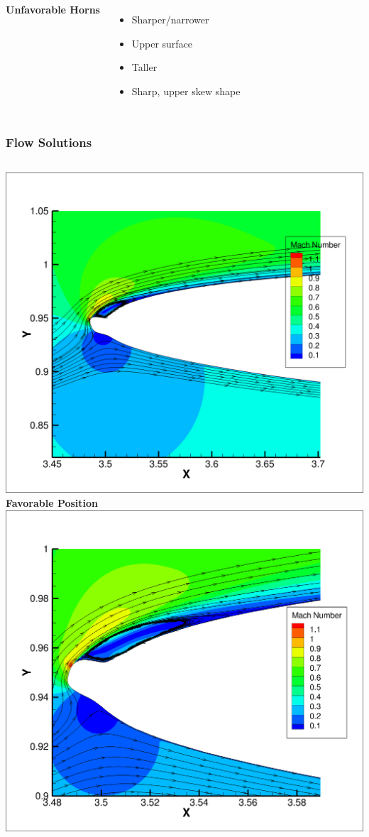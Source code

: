 \documentclass[9pt]{beamer}
\begin{document}
\begin{frame}
\begin{columns}[c]
    {\bf Unfavorable Horns}
    \begin{itemize}
      \item Sharper/narrower
      \item Upper surface
      \item Taller
      \item Sharp, upper skew shape
    \end{itemize}
\end{columns}
\end{frame}
\begin{frame}
\frametitle{Flow Solutions}
\label{sec-3-6}


\begin{columns}[c]
    \centering
    \includegraphics[width=1\textwidth]{GoodHorn.png} \\
    {\bf Favorable Position}
    \includegraphics[width=1\textwidth]{GoodHornPOD.png} \\

\end{columns}
\end{frame}
\end{document}
